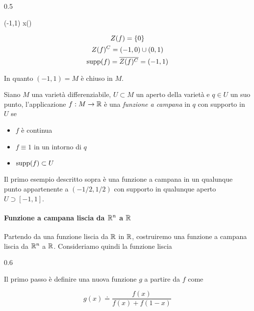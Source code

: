 	{0.5}{%
				{(-1,1)}{\R}
				{x}{\tan()}
			
			\begin{gather}
				Z(f) = \{0\} \\
				Z(f)^{C} = (-1,0) \cup (0,1) \\
				\operatorname{supp}(f) = \overline{Z(f)^{C}} = (-1,1)
			\end{gather}
		
			In quanto $ (-1,1) = M $ è chiuso in $ M $.
			}

Siano $ M $ una varietà differenziabile, $ U \subset M $ un aperto della varietà e $ q \in U $ un suo punto, l'applicazione $ f : M \to \mathbb{R} $ è una \textit{funzione a campana} in $ q $ con supporto in $ U $ se

\begin{itemize}
	\item $ f $ è continua
	
	\item $ f \equiv 1 $ in un intorno di $ q $
	
	\item $ \operatorname{supp}(f) \subset U $
\end{itemize}

Il primo esempio descritto sopra è una funzione a campana in un qualunque punto appartenente a $ (-1/2,1/2) $ con supporto in qualunque aperto $ U \supset [-1,1] $.

\paragraph{Funzione a campana liscia da $ \mathbb{R}^{n} $ a $ \mathbb{R} $}

Partendo da una funzione liscia da $ \mathbb{R} $ in $ \mathbb{R} $, costruiremo una funzione a campana liscia da $ \mathbb{R}^{n} $ a $ \mathbb{R} $. Consideriamo quindi la funzione liscia

	{0.6}{%
			}

Il primo passo è definire una nuova funzione $ g $ a partire da $ f $ come

\begin{equation}
	g(x) \doteq \dfrac{f(x)}{f(x) + f(1-x)}
\end{equation}

